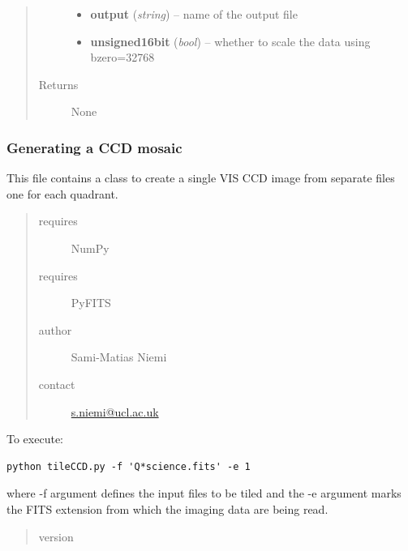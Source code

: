 \documentclass[a4paper,11pt,english]{sphinxmanual}
\begin{document}
\begin{fulllineitems}
\begin{fulllineitems}
\begin{quote}
\begin{description}
\begin{itemize}
\item {} 
\textbf{output} (\emph{string}) -- name of the output file

\item {} 
\textbf{unsigned16bit} (\emph{bool}) -- whether to scale the data using bzero=32768

\end{itemize}

\item[{Returns}] \leavevmode
None

\end{description}\end{quote}

\end{fulllineitems}


\end{fulllineitems}

\label{postproc:module-postproc.tileCCD}

\subsubsection{Generating a CCD mosaic}
\label{postproc:generating-a-ccd-mosaic}
This file contains a class to create a single VIS CCD image from separate files one for each quadrant.
\begin{quote}\begin{description}
\item[{requires}] \leavevmode
NumPy

\item[{requires}] \leavevmode
PyFITS

\item[{author}] \leavevmode
Sami-Matias Niemi

\item[{contact}] \leavevmode
\href{mailto:s.niemi@ucl.ac.uk}{s.niemi@ucl.ac.uk}

\end{description}\end{quote}

To execute:

\begin{Verbatim}[commandchars=\\\{\}]
python tileCCD.py -f 'Q*science.fits' -e 1
\end{Verbatim}

where -f argument defines the input files to be tiled and the -e argument marks the
FITS extension from which the imaging data are being read.
\begin{quote}\begin{description}
\item[{version}] 

\end{description}\end{quote}
\end{document}
